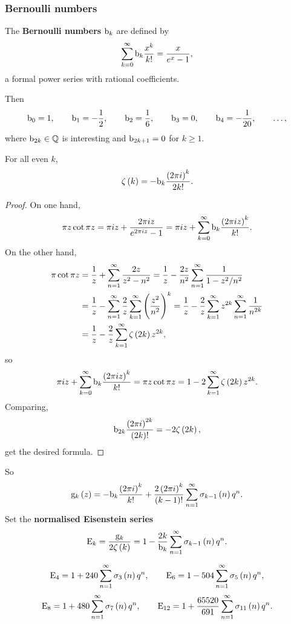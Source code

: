 \subsubsection{Bernoulli numbers}

\begin{definition}
The \textbf{Bernoulli numbers} $ \mathrm{b}_k $ are defined by
$$ \sum_{k = 0}^\infty \mathrm{b}_k\dfrac{x^k}{k!} = \dfrac{x}{e^x - 1}, $$
a formal power series with rational coefficients.
\end{definition}

Then
$$ \mathrm{b}_0 = 1, \qquad \mathrm{b}_1 = -\dfrac{1}{2}, \qquad \mathrm{b}_2 = \dfrac{1}{6}, \qquad \mathrm{b}_3 = 0, \qquad \mathrm{b}_4 = -\dfrac{1}{20}, \qquad \dots, $$
where $ \mathrm{b}_{2k} \in \mathbb{Q} $ is interesting and $ \mathrm{b}_{2k + 1} = 0 $ for $ k \ge 1 $.

\pagebreak

\begin{proposition}
For all even $ k $,
$$ \zeta\br{k} = -\b_k\dfrac{\br{2\pi i}^k}{2k!}. $$
\end{proposition}

\begin{proof}
On one hand,
$$ \pi z\cot \pi z = \pi iz + \dfrac{2\pi iz}{e^{2\pi iz} - 1} = \pi iz + \sum_{k = 0}^\infty \b_k\dfrac{\br{2\pi iz}^k}{k!}. $$
On the other hand,
\begin{align*}
\pi\cot \pi z
& = \dfrac{1}{z} + \sum_{n = 1}^\infty \dfrac{2z}{z^2 - n^2}
= \dfrac{1}{z} - \dfrac{2z}{n^2}\sum_{n = 1}^\infty \dfrac{1}{1 - z^2 / n^2} \\
& = \dfrac{1}{z} - \sum_{n = 1}^\infty \dfrac{2}{z}\sum_{k = 1}^\infty \br{\dfrac{z^2}{n^2}}^k
= \dfrac{1}{z} - \dfrac{2}{z}\sum_{k = 1}^\infty z^{2k}\sum_{n = 1}^\infty \dfrac{1}{n^{2k}} \\
& = \dfrac{1}{z} - \dfrac{2}{z}\sum_{k = 1}^\infty \zeta\br{2k}z^{2k},
\end{align*}
so
$$ \pi iz + \sum_{k = 0}^\infty \b_k\dfrac{\br{2\pi iz}^k}{k!} = \pi z\cot \pi z = 1 - 2\sum_{k = 1}^\infty \zeta\br{2k}z^{2k}. $$
Comparing,
$$ \b_{2k}\dfrac{\br{2\pi i}^{2k}}{\br{2k}!} = -2\zeta\br{2k}, $$
get the desired formula.
\end{proof}

So
$$ \g_k\br{z} = -\b_k\dfrac{\br{2\pi i}^k}{k!} + \dfrac{2\br{2\pi i}^k}{\br{k - 1}!}\sum_{n = 1}^\infty \sigma_{k - 1}\br{n}q^n. $$
Set the \textbf{normalised Eisenstein series}
$$ \E_k = \dfrac{\g_k}{2\zeta\br{k}} = 1 - \dfrac{2k}{\b_k}\sum_{n = 1}^\infty \sigma_{k - 1}\br{n}q^n. $$

\begin{example*}
$$ \E_4 = 1 + 240\sum_{n = 1}^\infty \sigma_3\br{n}q^n, \qquad \E_6 = 1 - 504\sum_{n = 1}^\infty \sigma_5\br{n}q^n, $$
$$ \E_8 = 1 + 480\sum_{n = 1}^\infty \sigma_7\br{n}q^n, \qquad \E_{12} = 1 + \dfrac{65520}{691}\sum_{n = 1}^\infty \sigma_{11}\br{n}q^n. $$
\end{example*}

